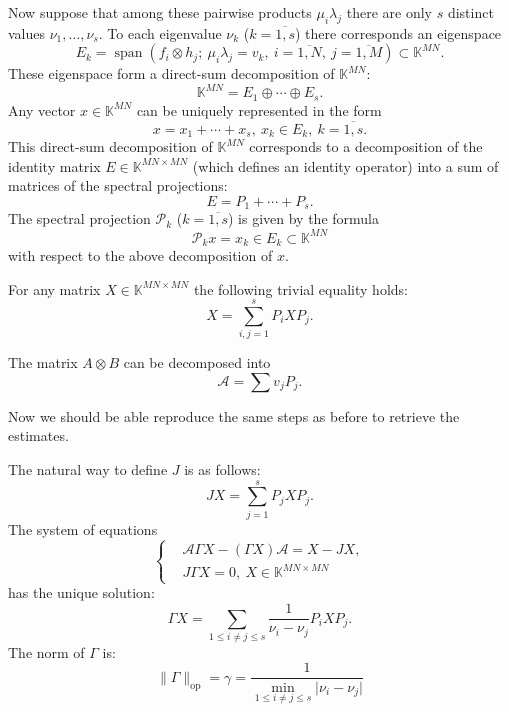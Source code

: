 \documentclass[a4paper]{jpconf}
\begin{document}
Now suppose that among these pairwise products \( \mu_i \lambda_j \)
    there are only \( s \) distinct values \( \nu_1, \ldots, \nu_s \).
To each eigenvalue \( \nu_k \) (\( k{=}\overline{1,s} \)) there corresponds
    an eigenspace \[ E_k = \operatorname{span}(f_i\otimes h_j;\ \mu_i\lambda_j = v_k,\ i{=}\overline{1,N},\ j{=}\overline{1,M}) \subset \mathbb{K}^{MN}. \]
These eigenspace form a direct-sum decomposition of \( \mathbb{K}^{MN} \):
    \[ \mathbb{K}^{MN} = E_1 \oplus \cdots \oplus E_s. \]
Any vector \( x\in\mathbb{K}^{MN} \) can be uniquely represented
    in the form
    \[
        x = x_1 + \cdots + x_s,\ x_k\in E_k,\ k=\overline{1,s}.
    \]
This direct-sum decomposition of \( \mathbb{K}^{MN} \)
    corresponds to a decomposition of the identity matrix \( E\in \mathbb{K}^{MN{\times}MN} \)
    (which defines an identity operator)
    into a sum of matrices of the spectral projections:
    \[
        E = P_1 + \cdots + P_s.
    \]
The spectral projection \( \mathcal{P}_k \) (\(k{=}\overline{1,s}\)) is given by the formula
    \[
        \mathcal{P}_k x = x_k \in E_k\subset \mathbb{K}^{MN}
    \]
    with respect to the above decomposition of \( x \).

For any matrix \( X\in \mathbb{K}^{MN{\times}MN} \)
    the following trivial equality holds:
    \[
        X = \sum_{i,j=1}^s P_i X P_j.
    \]

The matrix \( A\otimes B \) can be decomposed into
    \[
        \mathcal{A} = \sum v_j P_j.
    \]

Now we should be able reproduce the same steps as before
    to retrieve the estimates.

The natural way to define \( J \) is as follows:
    \[
        JX = \sum_{j=1}^s P_j X P_j.
    \]
The system of equations
    \[\left\{\begin{aligned}
        & \mathcal{A}\Gamma X - (\Gamma X) \mathcal{A} = X - JX, \\
        & J\Gamma X = 0,\ X\in \mathbb{K}^{MN{\times}MN}
    \end{aligned}\right.\]
    has the unique solution:
    \[
        \Gamma X = \sum_{1\leq i{\neq}j \leq s} \frac{1}{\nu_i-\nu_j} P_i X P_j.
    \]
    The norm of \( \Gamma \) is:
    \[
        \|\Gamma\|_{\mathrm{op}} = \gamma = \frac{1}{\min_{1\leq i{\neq}j\leq s}\lvert\nu_i - \nu_j\rvert}
    \]
\end{document}
